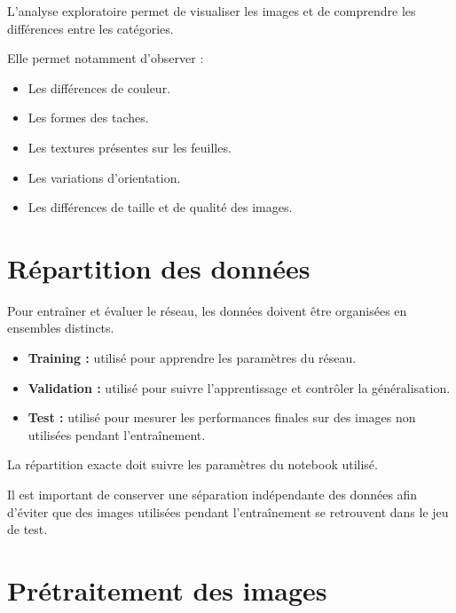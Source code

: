 \documentclass[12pt,a4paper,oneside]{report}
\begin{document}
L'analyse exploratoire permet de visualiser les images
et de comprendre les différences entre les catégories.

Elle permet notamment d'observer :

\begin{itemize}
    \item Les différences de couleur.
    \item Les formes des taches.
    \item Les textures présentes sur les feuilles.
    \item Les variations d'orientation.
    \item Les différences de taille et de qualité des images.
\end{itemize}

%

\section{Répartition des données}

Pour entraîner et évaluer le réseau, les données doivent
être organisées en ensembles distincts.

\begin{itemize}
    \item \textbf{Training :} utilisé pour apprendre
    les paramètres du réseau.
    \item \textbf{Validation :} utilisé pour suivre
    l'apprentissage et contrôler la généralisation.
    \item \textbf{Test :} utilisé pour mesurer les
    performances finales sur des images non utilisées
    pendant l'entraînement.
\end{itemize}

La répartition exacte doit suivre les paramètres
du notebook utilisé.

Il est important de conserver une séparation indépendante
des données afin d'éviter que des images utilisées
pendant l'entraînement se retrouvent dans le jeu de test.

\section{Prétraitement des images}
\end{document}

